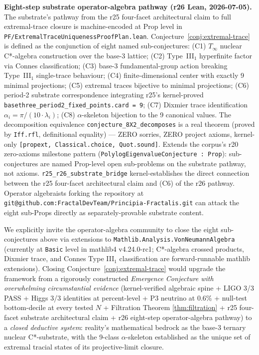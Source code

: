 \documentclass[11pt,a4paper]{amsart}
\theoremstyle{plain}
\theoremstyle{definition}
\begin{document}
\textbf{Eight-step substrate operator-algebra pathway (r26 Lean, 2026-07-05).} The substrate's pathway from the r25 four-facet architectural claim to full extremal-trace closure is machine-encoded at Prop level in \texttt{PF/ExtremalTraceUniquenessProofPlan.lean}. Conjecture~\ref{conj:extremal-trace} is defined as the conjunction of eight named sub-conjectures: (C1) $T_\infty$ nuclear C*-algebra construction over the base-3 lattice; (C2) Type~III$_1$ hyperfinite factor via Connes classification; (C3) base-3 fundamental-group action breaking Type~III$_1$ single-trace behaviour; (C4) finite-dimensional center with exactly 9 minimal projections; (C5) extremal traces bijective to minimal projections; (C6) period-2 substrate correspondence integrating r25's kernel-proved \texttt{basethree\_period2\_fixed\_points.card = 9}; (C7) Dixmier trace identification $\alpha_i = \pi/(10 \cdot \lambda_i)$; (C8) $\alpha$-skeleton bijection to the 9 canonical values. The decomposition equivalence \texttt{conjecture\_8X2\_decomposes} is a real theorem (proved by \texttt{Iff.rfl}, definitional equality) --- ZERO sorries, ZERO project axioms, kernel-only \texttt{[propext, Classical.choice, Quot.sound]}. Extends the corpus's r20 zero-axioms milestone pattern (\texttt{PolylogEigenvalueConjecture : Prop}): sub-conjectures are named Prop-level open sub-problems on the substrate pathway, not axioms. \texttt{r25\_r26\_substrate\_bridge} kernel-establishes the direct connection between the r25 four-facet architectural claim and (C6) of the r26 pathway. Operator algebraists forking the repository at \texttt{git@github.com:FractalDevTeam/Principia-Fractalis.git} can attack the eight sub-Props directly as separately-provable substrate content.

We explicitly invite the operator-algebra community to close the eight sub-conjectures above via extensions to \texttt{Mathlib.Analysis.VonNeumannAlgebra} (currently at \texttt{Basic} level in mathlib4 v4.24.0-rc1; C*-algebra crossed products, Dixmier trace, and Connes Type III$_1$ classification are forward-runnable mathlib extensions). Closing Conjecture~\ref{conj:extremal-trace} would upgrade the framework from a rigorously constructed \emph{Emergence Conjecture with overwhelming circumstantial evidence} (kernel-verified algebraic spine + LIGO 3/3 PASS + Higgs 3/3 identities at percent-level + P3 neutrino at 0.6\% + null-test bottom-decile at every tested $N$ + Filtration Theorem \ref{thm:filtration} + r25 four-facet substrate architectural claim + r26 eight-step operator-algebra pathway) to a \emph{closed deductive system}: reality's mathematical bedrock as the base-3 ternary nuclear C*-substrate, with the 9-class $\alpha$-skeleton established as the unique set of extremal tracial states of its projective-limit closure.
\end{document}
